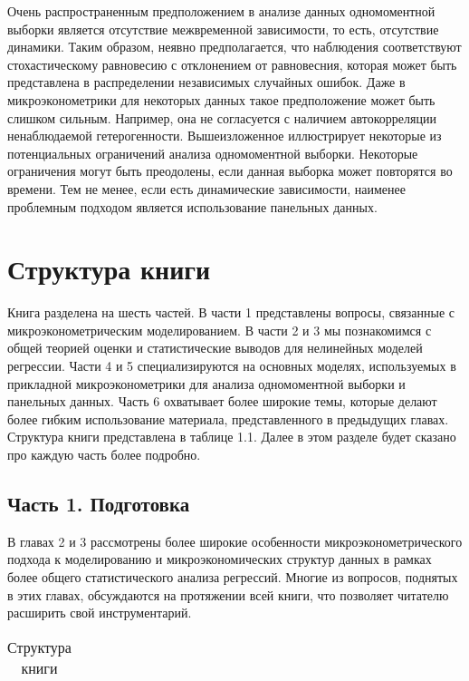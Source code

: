 	Очень распространенным предположением в анализе данных одномоментной выборки является отсутствие межвременной зависимости, то есть, отсутствие динамики. Таким образом, неявно предполагается, что наблюдения соответствуют стохастическому равновесию с отклонением от равновесния, которая может быть представлена в распределении независимых случайных ошибок. Даже в микроэконометрики для некоторых данных такое предположение может быть слишком сильным. Например, она не согласуется с наличием автокорреляции ненаблюдаемой гетерогенности.
	Вышеизложенное иллюстрирует некоторые из потенциальных ограничений анализа одномоментной выборки. Некоторые ограничения могут быть преодолены, если данная выборка может повторятся во времени. Тем не менее, если есть динамические зависимости, наименее проблемным подходом является использование панельных данных.

\section{Структура книги}

	Книга разделена на шесть частей. В части 1 представлены вопросы, связанные с микроэконометрическим моделированием. В части 2 и 3 мы познакомимся с общей теорией оценки и статистические выводов для нелинейных моделей регрессии. Части 4 и 5 специализируются на основных моделях, используемых в прикладной микроэконометрики для анализа одномоментной выборки и панельных данных. Часть 6 охватывает более широкие темы, которые делают более гибким использование материала, представленного в предыдущих главах.
	Структура книги представлена в таблице 1.1. Далее в этом разделе будет сказано про каждую часть более подробно.
	
\subsection{Часть 1. Подготовка}

	В главах 2 и 3 рассмотрены более широкие особенности микроэконометрического подхода к моделированию и микроэкономических структур данных в рамках более общего статистического анализа регрессий. Многие из вопросов, поднятых в этих главах, обсуждаются на протяжении всей книги, что позволяет читателю расширить свой инструментарий.

\begin{table}[h]
\begin{center}
\caption{\label{tab:pred}Структура книги}
\begin{tabular}[t]{llcll|}
\hline
\hline
\end{tabular}
\end{center}
\end{table}

